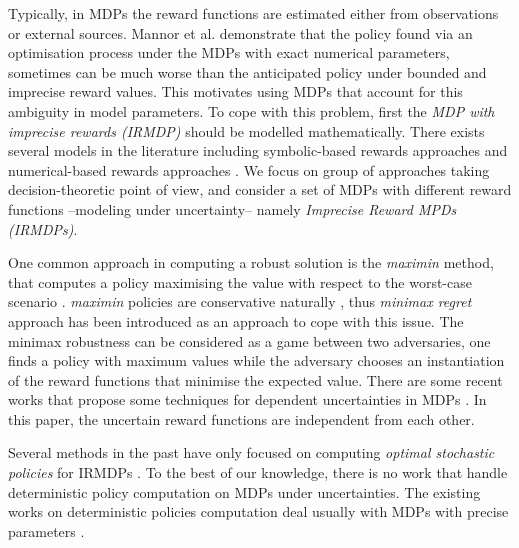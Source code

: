 
Typically, in MDPs the reward functions are estimated either from observations or external sources. Mannor et al.  demonstrate that the policy found via an optimisation process under the MDPs with exact numerical parameters, sometimes can be much worse than the anticipated policy under bounded and imprecise reward values. This motivates using MDPs that account for this ambiguity in model parameters. To cope with this problem, first the \textit{MDP with imprecise rewards (IRMDP)} should be modelled mathematically. There exists several models in the literature including symbolic-based rewards approaches \cite{Furnkranz2012,Weng2012} and numerical-based rewards approaches \cite{bell1982,Regan2009,Xu2009}. We focus on group of approaches taking decision-theoretic point of view, and consider a set of MDPs with different reward functions --modeling under uncertainty-- namely \textit{Imprecise Reward MPDs (IRMDPs)}. 

One common approach in computing a robust solution is the \textit{maximin} method, that computes a policy maximising the value with respect to the worst-case scenario \cite{GIVAN2000,Iyengar2005,mastin2012,Nilim2005}. \textit{maximin} policies are conservative naturally \cite{Delage2007}, thus \textit{minimax regret} approach \cite{Regan2009,Xu2009} has been introduced as an approach to cope with this issue. The minimax robustness can be considered as a game between two adversaries, one finds a policy with maximum values while the adversary chooses an instantiation of the reward functions that minimise the expected value. There are some recent works that propose some techniques for dependent uncertainties in MDPs \cite{Mannor2012,Wiesemann2013}. In this paper, the uncertain reward functions are independent from each other. 

Several methods in the past have only focused on computing  \textit{optimal stochastic policies} for IRMDPs \cite{Ahmed2017,Regan2009,Regan2010,Xu2009}. %
To the best of our knowledge, there is no work that handle deterministic policy computation on MDPs under uncertainties. The existing works on deterministic policies computation deal usually with MDPs with precise parameters \cite{Dolgov2005,Montufar2015}. %